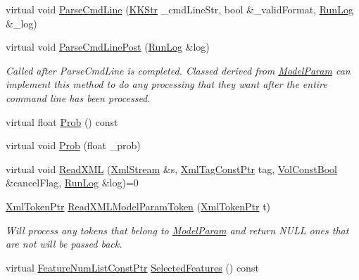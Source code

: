 \begin{DoxyCompactItemize}
\item 
virtual void \hyperlink{class_k_k_m_l_l_1_1_model_param_abdf3e98f2e1d1a0898c176d16d00f25b}{Parse\+Cmd\+Line} (\hyperlink{class_k_k_b_1_1_k_k_str}{K\+K\+Str} \+\_\+cmd\+Line\+Str, bool \&\+\_\+valid\+Format, \hyperlink{class_k_k_b_1_1_run_log}{Run\+Log} \&\+\_\+log)
\item 
virtual void \hyperlink{class_k_k_m_l_l_1_1_model_param_a0e6a3ff8350e01327835116ec202bba1}{Parse\+Cmd\+Line\+Post} (\hyperlink{class_k_k_b_1_1_run_log}{Run\+Log} \&log)
\begin{DoxyCompactList}\small\item\em Called after \textquotesingle{}Parse\+Cmd\+Line\textquotesingle{} is completed. Classed derived from \textquotesingle{}\hyperlink{class_k_k_m_l_l_1_1_model_param}{Model\+Param}\textquotesingle{} can implement this method to do any processing that they want after the entire command line has been processed. \end{DoxyCompactList}\item 
virtual float \hyperlink{class_k_k_m_l_l_1_1_model_param_a7b81cab9a8337bc180cb834cd6cca1d9}{Prob} () const 
\item 
virtual void \hyperlink{class_k_k_m_l_l_1_1_model_param_a35da9865326e4e34bfb0363cae092080}{Prob} (float \+\_\+prob)
\item 
virtual void \hyperlink{class_k_k_m_l_l_1_1_model_param_a671c3ef465614d548e3730ca0427eb67}{Read\+X\+ML} (\hyperlink{class_k_k_b_1_1_xml_stream}{Xml\+Stream} \&s, \hyperlink{namespace_k_k_b_a5f1b0b1667d79fec26deeff10c43df23}{Xml\+Tag\+Const\+Ptr} tag, \hyperlink{namespace_k_k_b_a7d390f568e2831fb76b86b56c87bf92f}{Vol\+Const\+Bool} \&cancel\+Flag, \hyperlink{class_k_k_b_1_1_run_log}{Run\+Log} \&log)=0
\item 
\hyperlink{namespace_k_k_b_af349a060847626df6b468fe15d373972}{Xml\+Token\+Ptr} \hyperlink{class_k_k_m_l_l_1_1_model_param_a6d51128c4b26cb4c432091dc2e21415d}{Read\+X\+M\+L\+Model\+Param\+Token} (\hyperlink{namespace_k_k_b_af349a060847626df6b468fe15d373972}{Xml\+Token\+Ptr} t)
\begin{DoxyCompactList}\small\item\em Will process any tokens that belong to \textquotesingle{}\hyperlink{class_k_k_m_l_l_1_1_model_param}{Model\+Param}\textquotesingle{} and return N\+U\+LL ones that are not will be passed back. \end{DoxyCompactList}\item 
virtual \hyperlink{namespace_k_k_m_l_l_a81284b0a14973267260023f9a72da94a}{Feature\+Num\+List\+Const\+Ptr} \hyperlink{class_k_k_m_l_l_1_1_model_param_a99ae86303829d99bd252ccf4c4e672f8}{Selected\+Features} () const 

\end{DoxyCompactItemize}
